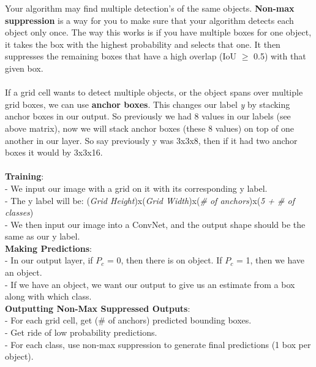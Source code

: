 \documentclass[11pt, a4paper]{article}
\begin{document}
\begin{spacing}{1.1}
	Your algorithm may find multiple detection's of the same objects. \textbf{Non-max suppression} is a way for you to make sure that your algorithm detects each object only once. The way this works is if you have multiple boxes for one object, it takes the box with the highest probability and selects that one. It then suppresses the remaining boxes that have a high overlap (IoU $\geq$ 0.5) with that given box. \\~\\
	If a grid cell wants to detect multiple objects, or the object spans over multiple grid boxes, we can use \textbf{anchor boxes}. This changes our label \textit{y} by stacking anchor boxes in our output. So previously we had 8 values in our labels (see above matrix), now we will stack anchor boxes (these 8 values) on top of one another in our layer. So say previously y was 3x3x8, then if it had two anchor boxes it would by 3x3x16. \\~\\
	\textbf{Training}:\\
	- We input our image with a grid on it with its corresponding y label. \\
	- The y label will be: (\textit{Grid Height})x(\textit{Grid Width})x(\textit{\# of anchors})x(\textit{5 + \# of classes}) \\
	- We then input our image into a ConvNet, and the output shape should be the same as our y label. \vspace*{1mm}\\
	\textbf{Making Predictions}:\\
	- In our output layer, if $P_c$ = 0, then there is on object. If $P_c$ = 1, then we have an object. \\
	- If we have an object, we want our output to give us an estimate from a box along with which class. \vspace*{1mm}\\
	\textbf{Outputting Non-Max Suppressed Outputs}: \\
	- For each grid cell, get (\# of anchors) predicted bounding boxes. \\
	- Get ride of low probability predictions. \\
	- For each class, use non-max suppression to generate final predictions (1 box per object). \newpage


\end{spacing}
\end{document}
